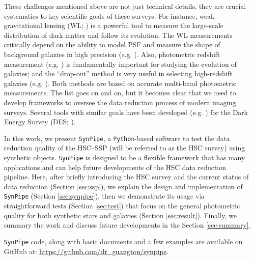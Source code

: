 \documentclass[useamsfonts]{pasj01}
\def\synpipe{\texttt{SynPipe}}
\begin{document}
    These challenges mentioned above are not just technical details, they are crucial 
    systematics to key scientific goals of these surveys. 
    For instance, weak gravitational lensing (WL; \citealt{Kaiser1993, Bartelmann2001}) 
    is a powerful tool to measure the large-scale distribution of dark matter and 
    follow its evolution. 
    The WL measurements critically depend on the ability to model PSF and measure the
    shape of background galaxies in high precision (e.g. \citealt{Mandelbaum2015}). 
    Also, photometric redshift measurement (e.g. \citealt{Benitez2000, Bolzonella2000,
    Ilbert2009}) is fundamentally important for studying the evolution of galaxies; 
    and the ``drop-out'' method is very useful in selecting high-redshift galaxies 
    (e.g. \citealt{Steidel1996}). 
    Both methods are based on accurate multi-band photometric measurements. 
    The list goes on and on, but it becomes clear that we need to develop frameworks 
    to oversee the data reduction process of modern imaging surveys. 
    Several tools with similar goals have been developed (e.g. \citealt{Chang2015, 
    Suchyta2016}) for the Dark Energy Survey (DES; \citealt{DES2005}). 

    In this work, we present \synpipe{}, a \texttt{Python}-based 
    software to test the data reduction quality of the HSC--SSP (will be referred to 
    as the HSC survey) using synthetic objects.   
    \synpipe{} is designed to be a flexible framework that has many applications 
    and can help future developments of the HSC data reduction pipeline.
    Here, after briefly introducing the HSC survey and the current status of 
    data reduction (Section \ref{sec:ssp}), we explain the design and implementation 
    of \synpipe{} (Section \ref{sec:synpipe}), then we demonstrate its usage via 
    straightforward tests (Section \ref{sec:test}) that focus on the general 
    photometric quality for both synthetic stars and galaxies 
    (Section \ref{sec:result}). 
    Finally, we summary the work and discuss future developments in the 
    Section \ref{sec:summary}. 
    
    \synpipe{} code, along with basic documents and a few examples are available 
    on GitHub at: \url{https://github.com/dr_guangtou/synpipe}.
\end{document}
